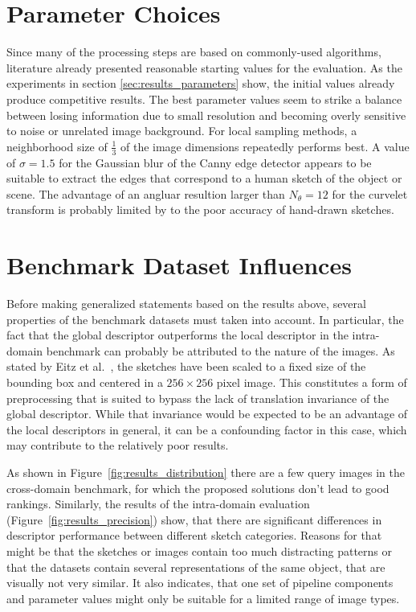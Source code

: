 \section{Parameter Choices}

Since many of the processing steps are based on commonly-used algorithms,
literature already presented reasonable starting values for the evaluation. As
the experiments in section \ref{sec:results_parameters} show, the initial
values already produce competitive results. The best parameter values seem to
strike a balance between losing information due to small resolution and
becoming overly sensitive to noise or unrelated image background. For local
sampling methods, a neighborhood size of $\frac{1}{3}$ of the image dimensions
repeatedly performs best. A value of $\sigma=1.5$ for the Gaussian blur of the
Canny edge detector appears to be suitable to extract the edges that correspond
to a human sketch of the object or scene. The advantage of an angluar resultion
larger than $N_{\theta}=12$ for the curvelet transform is probably limited by
to the poor accuracy of hand-drawn sketches.

\section{Benchmark Dataset Influences}

Before making generalized statements based on the results above, several
properties of the benchmark datasets must taken into account. In particular,
the fact that the global descriptor outperforms the local descriptor in the
intra-domain benchmark can probably be attributed to the nature of the images.
As stated by Eitz et al.\ \autocite{eitz_how_2012}, the sketches have been
scaled to a fixed size of the bounding box and centered in a $256 \times 256$
pixel image. This constitutes a form of preprocessing that is suited to bypass
the lack of translation invariance of the global descriptor. While that
invariance would be expected to be an advantage of the local descriptors in
general, it can be a confounding factor in this case, which may contribute to
the relatively poor results.

As shown in Figure~\ref{fig:results_distribution} there are a few query images
in the cross-domain benchmark, for which the proposed solutions don't lead to
good rankings. Similarly, the results of the intra-domain evaluation
(Figure~\ref{fig:results_precision}) show, that there are significant
differences in descriptor performance between different sketch categories.
Reasons for that might be that the sketches or images contain too much
distracting patterns or that the datasets contain several representations of
the same object, that are visually not very similar. It also indicates, that
one set of pipeline components and parameter values might only be suitable for
a limited range of image types.
